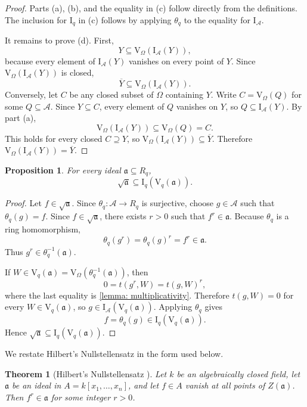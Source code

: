 \documentclass[a4paper,12pt]{article}
\let\cite\parencite
\newtheorem{proposition}[lemma]{Proposition}
\newtheorem{theorem}[lemma]{Theorem}
\theoremstyle{definition}
\newcommand\cA{\mathcal{A}}
\newcommand\V{\mathrm{V}_{\Omega}}
\newcommand\Vq{\mathrm{V}_{q}}
\newcommand\Iq{\mathrm{I}_{q}}
\newcommand\IA{\mathrm{I}_{\cA}}
\newcommand\Rq{R_q}
\newcommand\thetaq{\theta_q}
\begin{document}
\begin{proof}
Parts (a), (b), and the equality in (c) follow directly from the definitions. The inclusion for $\Iq$ in (c) follows by applying $\thetaq$ to the equality for $\IA$.

It remains to prove (d). First,
\[
    Y\subseteq\V(\IA(Y)),
\]
because every element of $\IA(Y)$ vanishes on every point of $Y$. Since $\V(\IA(Y))$ is closed,
\[
    \overline Y\subseteq\V(\IA(Y)).
\]
Conversely, let $C$ be any closed subset of $\Omega$ containing $Y$. Write $C=\V(Q)$ for some $Q\subseteq\cA$. Since $Y\subseteq C$, every element of $Q$ vanishes on $Y$, so $Q\subseteq\IA(Y)$. By part (a),
\[
    \V(\IA(Y))\subseteq\V(Q)=C.
\]
This holds for every closed $C\supseteq Y$, so $\V(\IA(Y))\subseteq\overline Y$. Therefore $\V(\IA(Y))=\overline Y$.
\end{proof}

\begin{proposition}\label{proposition: radical inclusion}
For every ideal $\mathfrak a\subseteq\Rq$,
\[
    \sqrt{\mathfrak a}\subseteq \Iq(\Vq(\mathfrak a)).
\]
\end{proposition}

\begin{proof}
Let $f\in\sqrt{\mathfrak a}$. Since $\thetaq:\cA\to\Rq$ is surjective, choose $g\in\cA$ such that $\thetaq(g)=f$. Since $f\in\sqrt{\mathfrak a}$, there exists $r>0$ such that $f^r\in\mathfrak a$. Because $\thetaq$ is a ring homomorphism,
\[
    \thetaq(g^r)=\thetaq(g)^r=f^r\in\mathfrak a.
\]
Thus $g^r\in\thetaq^{-1}(\mathfrak a)$.

If $W\in\Vq(\mathfrak a)=\V(\thetaq^{-1}(\mathfrak a))$, then
\[
    0=t(g^r,W)=t(g,W)^r,
\]
where the last equality is \cref{lemma: multiplicativity}. Therefore $t(g,W)=0$ for every $W\in\Vq(\mathfrak a)$, so $g\in\IA(\Vq(\mathfrak a))$. Applying $\thetaq$ gives
\[
    f=\thetaq(g)\in\Iq(\Vq(\mathfrak a)).
\]
Hence $\sqrt{\mathfrak a}\subseteq\Iq(\Vq(\mathfrak a))$.
\end{proof}

We restate Hilbert's Nullstellensatz in the form used below.

\begin{theorem}[Hilbert's Nullstellensatz \cite{hartshorne}]\label{theorem: classical HN}
Let $k$ be an algebraically closed field, let $\mathfrak a$ be an ideal in $A=k[x_1,\ldots,x_n]$, and let $f\in A$ vanish at all points of $Z(\mathfrak a)$. Then $f^r\in\mathfrak a$ for some integer $r>0$.
\end{theorem}
\end{document}

